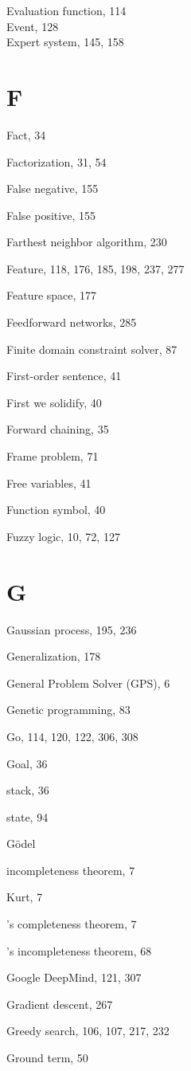 \documentclass[10pt]{book}
\begin{document}
Evaluation function, 114\\
Event, 128\\
Expert system, 145, 158\\
\section{F}
Fact, 34

Factorization, 31, 54

False negative, 155

False positive, 155

Farthest neighbor algorithm, 230

Feature, 118, 176, 185, 198, 237, 277

Feature space, 177

Feedforward networks, 285

Finite domain constraint solver, 87

First-order sentence, 41

First we solidify, 40

Forward chaining, 35

Frame problem, 71

Free variables, 41

Function symbol, 40

Fuzzy logic, 10, 72, 127

\section{G}
Gaussian process, 195, 236

Generalization, 178

General Problem Solver (GPS), 6

Genetic programming, 83

Go, 114, 120, 122, 306, 308

Goal, 36

stack, 36

state, 94

G\"odel

incompleteness theorem, 7

Kurt, 7

's completeness theorem, 7

's incompleteness theorem, 68

Google DeepMind, 121, 307

Gradient descent, 267

Greedy search, 106, 107, 217, 232

Ground term, 50
\end{document}
